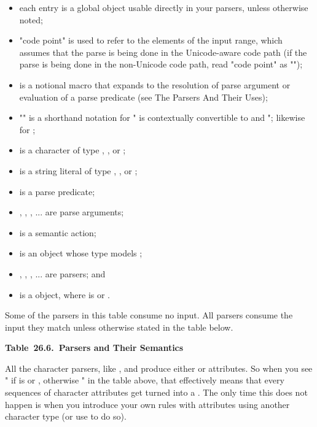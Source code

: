\documentclass{MyBook}
\begin{document}
\begin{itemize}
\item
  each entry is a global object usable directly in your parsers, unless otherwise noted;
\item
  "code point" is used to refer to the elements of the input range, which assumes that the parse is being done in the Unicode-aware code path (if the parse is being done in the non-Unicode code path, read "code point" as "");
\item
  \emph{}\ci{()} is a notional macro that expands to the resolution of parse argument or evaluation of a parse predicate (see The Parsers And Their Uses);
\item
  "\emph{}" is a shorthand notation for "\emph{} is contextually convertible to  and "; likewise for ;
\item
   is a character of type , , or ;
\item
   is a string literal of type , , or ;
\item
   is a parse predicate;
\item
  , , , ... are parse arguments;
\item
   is a semantic action;
\item
   is an object whose type models ;
\item
  , , , ... are parsers; and
\item
   is a  object, where  is  or .
\end{itemize}



\begin{marker}[title=Note ]
Some of the parsers in this table consume no input. All parsers consume the input they match unless otherwise stated in the table below. 
\end{marker}

\textbf{Table~26.6.~Parsers and Their Semantics}


\begin{marker}[title=Important ]
All the character parsers, like ,  and  produce either  or  attributes. So when you see " if \emph{} is  or , otherwise \emph{}" in the table above, that effectively means that every sequences of character attributes get turned into a . The only time this does not happen is when you introduce your own rules with attributes using another character type (or use  to do so). 
\end{marker}
\end{document}
